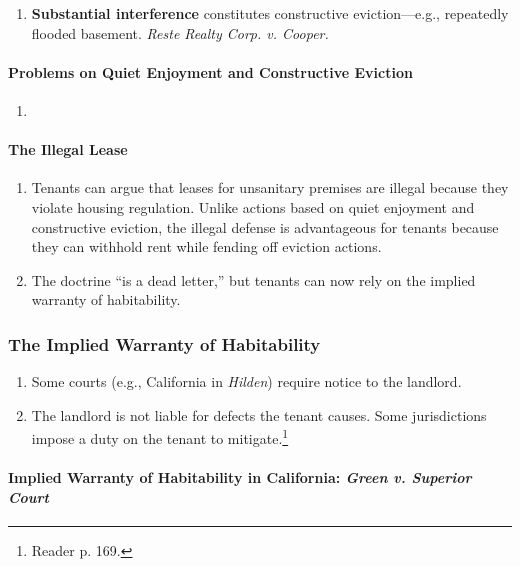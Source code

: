 \begin{enumerate}
    \item \textbf{Substantial interference} constitutes constructive 
    eviction---e.g., repeatedly flooded basement. \emph{Reste Realty Corp. v. 
    Cooper.}
\end{enumerate}

\paragraph{Problems on Quiet Enjoyment and Constructive Eviction}

\begin{enumerate}
    \item 
\end{enumerate}

\paragraph{The Illegal Lease}

\begin{enumerate}
    \item Tenants can argue that leases for unsanitary premises are illegal 
    because they violate housing regulation. Unlike actions based on quiet 
    enjoyment and constructive eviction, the illegal defense is advantageous 
    for tenants because they can withhold rent while fending off eviction 
    actions.
    \item The doctrine ``is a dead letter,'' but tenants can now rely on the 
    implied warranty of habitability. %
\end{enumerate}

\subsubsection{The Implied Warranty of Habitability}

\begin{enumerate}
    \item Some courts (e.g., California in \emph{Hilden}) require notice to 
    the landlord.
    \item The landlord is not liable for defects the tenant causes. Some 
    jurisdictions impose a duty on the tenant to mitigate.\footnote{Reader p. 
    169.}
\end{enumerate}

\paragraph{Implied Warranty of Habitability in California: \emph{Green v. 
Superior Court}}

